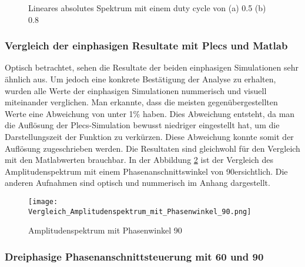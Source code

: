 \begin{figure}[ht!]
	\centering
	\qquad
	\caption{Lineares absolutes Spektrum mit einem duty cycle von (a) 0.5 (b) 0.8}
	\label{fig:plecs_Schwingungspakete_absolut log}
\end{figure}

\subsubsection{Vergleich der einphasigen Resultate mit Plecs und Matlab}

Optisch betrachtet, sehen die Resultate der beiden einphasigen Simulationen sehr ähnlich aus. Um jedoch eine konkrete Bestätigung der Analyse zu erhalten, wurden alle Werte der einphasigen Simulationen nummerisch und visuell miteinander verglichen. Man erkannte, dass die meisten gegenübergestellten Werte eine Abweichung von unter 1\% haben. Dies Abweichung entsteht, da man die Auflösung der Plecs-Simulation bewusst niedriger eingestellt hat, um die Darstellungszeit der Funktion zu verkürzen. Diese Abweichung konnte somit der Auflösung zugeschrieben werden. Die Resultaten sind gleichwohl für den Vergleich mit den Matlabwerten brauchbar. In der Abbildung \ref{fig:Amplitudenspektrum mit Phasenwinkel 90grad} ist der Vergleich des Amplitudenspektrum mit einem Phasenanschnittswinkel von 90\textdegree ersichtlich. Die anderen Aufnahmen sind optisch und nummerisch im Anhang dargestellt.



\begin{figure}[ht!]
	\centering
	\texttt{[image: Vergleich\_Amplitudenspektrum\_mit\_Phasenwinkel\_90.png]}	
	\caption{Amplitudenspektrum mit Phasenwinkel 90\textdegree}
	\label{fig:Amplitudenspektrum mit Phasenwinkel 90grad}
\end{figure}










\newpage

\subsubsection{Dreiphasige Phasenanschnittsteuerung mit 60\textdegree\hspace{0.02cm} und 90\textdegree\hspace{0.02cm}}


